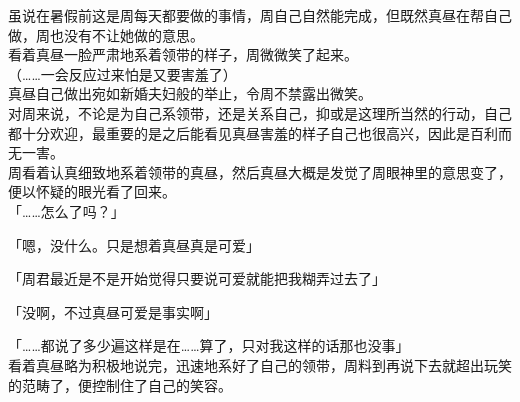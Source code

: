 虽说在暑假前这是周每天都要做的事情，周自己自然能完成，但既然真昼在帮自己做，周也没有不让她做的意思。\\

看着真昼一脸严肃地系着领带的样子，周微微笑了起来。\\

（……一会反应过来怕是又要害羞了）\\

真昼自己做出宛如新婚夫妇般的举止，令周不禁露出微笑。\\

对周来说，不论是为自己系领带，还是关系自己，抑或是这理所当然的行动，自己都十分欢迎，最重要的是之后能看见真昼害羞的样子自己也很高兴，因此是百利而无一害。\\

周看着认真细致地系着领带的真昼，然后真昼大概是发觉了周眼神里的意思变了，便以怀疑的眼光看了回来。\\

「……怎么了吗？」

「嗯，没什么。只是想着真昼真是可爱」

「周君最近是不是开始觉得只要说可爱就能把我糊弄过去了」

「没啊，不过真昼可爱是事实啊」

「……都说了多少遍这样是在……算了，只对我这样的话那也没事」\\

看着真昼略为积极地说完，迅速地系好了自己的领带，周料到再说下去就超出玩笑的范畴了，便控制住了自己的笑容。\\

